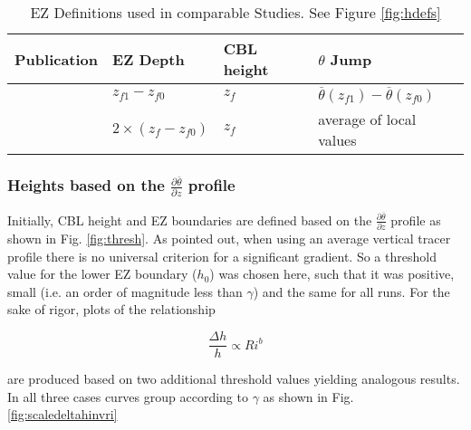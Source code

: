   
\begin{table}[htbp]
\label{table:elandri}
\caption[EZ Definitions used in comparable Studies]{EZ Definitions used in comparable Studies.  See Figure \ref{fig:hdefs}}

\begin{tabular}{ p{3.9cm} p{} p{} p{3cm}}

Publication & EZ Depth & CBL height & $\theta$ Jump\\ \hline
\cite{FedConzMir04} & $z_{f1} - z_{f0}$ & $z_{f}$ &  $\overline{\theta}(z_{f1})-\overline{\theta}(z_{f0})$\\ %
\cite{BrooksFowler2} & $2 \times (z_{f} - z_{f0})$ & $z_{f}$ & average of local values\\ \hline

\end{tabular}
\end{table}


\subsubsection{Heights based on the $\frac{\partial \overline{\theta}}{\partial z}$ profile}

Initially, CBL height and EZ boundaries are defined based on the $\frac{\partial \overline{\theta}}{\partial z}$ profile as shown in Fig. \ref{fig:thresh}.  As \cite{BrooksFowler2} pointed out, when using an average vertical tracer profile there is no universal criterion for a significant gradient.  So a threshold value for the lower EZ boundary ($h_{0}$) was chosen here, such that it was positive, small (i.e. an order of magnitude less than $\gamma$) and the same for all runs.  For the sake of rigor, plots of the relationship

\begin{equation}
\frac{\Delta h}{h} \propto Ri ^{b}
\end{equation}

are produced based on two additional threshold values yielding analogous results.  In all three cases curves group according to $\gamma$ as shown in Fig. \ref{fig:scaledeltahinvri}\\

